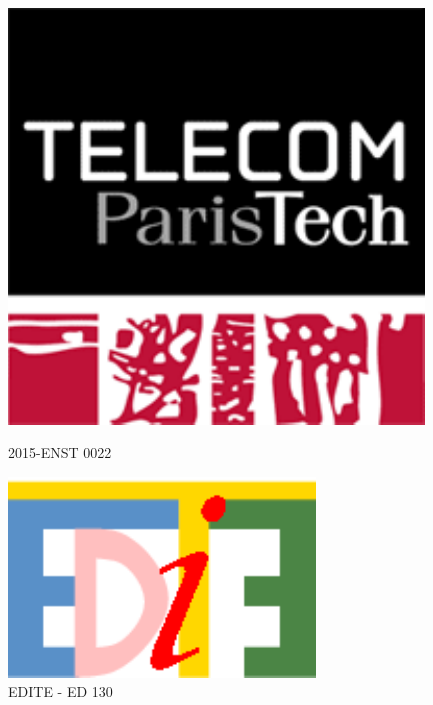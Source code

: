 \begin{titlepage}
\fontfamily{\sfdefault}\selectfont
\AddToShipoutPicture*{\BackgroundPic}
~


\begin{flushright}

\includegraphics[scale=0.45]{couverture/logo_TPT.pdf}

{\small {2015-ENST 0022}}
\end{flushright}



\begin{center}
%


\includegraphics[scale=0.65]{couverture/logo_edite.pdf} \\
{\small {EDITE - ED 130}}



\end{center}
\end{titlepage}
